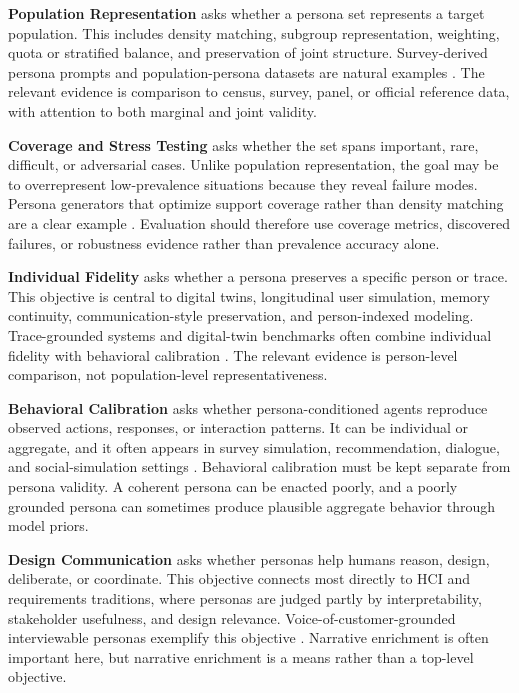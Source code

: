 \textbf{Population Representation} asks whether a persona set represents a
target population. This includes density matching, subgroup representation,
weighting, quota or stratified balance, and preservation of joint structure.
Survey-derived persona prompts and population-persona datasets are natural
examples \citep{arxiv251121722}.
The relevant evidence is comparison to census, survey, panel, or official
reference data, with attention to both marginal and joint validity.

\textbf{Coverage and Stress Testing} asks whether the set spans important,
rare, difficult, or adversarial cases. Unlike population representation, the
goal may be to overrepresent low-prevalence situations because they reveal
failure modes. Persona generators that optimize support coverage rather than
density matching are a clear example \citep{arxiv260203545}. Evaluation should
therefore use coverage metrics, discovered failures, or robustness evidence
rather than prevalence accuracy alone.

\textbf{Individual Fidelity} asks whether a persona preserves a specific person
or trace. This objective is central to digital twins, longitudinal user
simulation, memory continuity, communication-style preservation, and
person-indexed modeling. Trace-grounded systems and digital-twin benchmarks
often combine individual fidelity with behavioral calibration
\citep{arxiv260107110,arxiv251025536}. The relevant evidence is person-level
comparison, not population-level representativeness.

\textbf{Behavioral Calibration} asks whether persona-conditioned agents
reproduce observed actions, responses, or interaction patterns. It can be
individual or aggregate, and it often appears in survey simulation,
recommendation, dialogue, and social-simulation settings
\citep{arxiv250714922,arxiv260107110,arxiv251121722}. Behavioral calibration
must be kept separate from persona validity. A coherent persona can be enacted
poorly, and a poorly grounded persona can sometimes produce plausible aggregate
behavior through model priors.

\textbf{Design Communication} asks whether personas help humans reason, design,
deliberate, or coordinate. This objective connects most directly to HCI and
requirements traditions, where personas are judged partly by interpretability,
stakeholder usefulness, and design relevance. Voice-of-customer-grounded
interviewable personas exemplify this objective \citep{arxiv260122288}.
Narrative enrichment is often important here, but narrative enrichment is a
means rather than a top-level objective.

